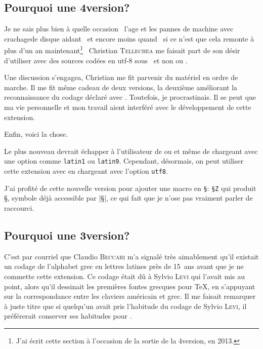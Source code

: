 \documentclass[full, french]{l3doc}
\newcommand*\PS{\texttt{\S}\xspace}
\newcommand*\PSVerb[1]{\texttt{\S #1}}
\newcommand{\TO}{\textemdash\ \ignorespaces}
\newcommand{\TF}{\unskip\ \textemdash\xspace}
\begin{document}
\subsection{Pourquoi une 4\ieme version?}

Je ne sais plus bien à quelle occasion \TO l'age et les pannes de machine
avec \og crachage\fg de disque aidant\TF et encore moins quand \TO si ce
n'est que cela remonte à plus d'un an maintenant\footnote{J'ai écrit cette
  section à l'occasion de la sortie de la 4\ieme version, en 2013.}\TF
Christian \textsc{Tellechea} me faisait part de son désir d'utiliser
 avec des sources codées en utf-8 sous  \TO et
non  ou .

Une discussion s'engagea, Christian me fit parvenir du matériel en
ordre de marche. Il me fit même cadeau de deux versions, la deuxième
améliorant la reconnaissance du codage déclaré avec
. Toutefois, je procrastinais. Il se peut que ma vie
personnelle et mon travail aient interféré avec le développement de
cette extension.

Enfin, voici la chose.

Le plus nouveau devrait échapper à l'utilisateur de 
ou  et même de  chargeant 
avec une option comme \texttt{latin1} ou \texttt{latin9}. Cependant,
désormais, on peut utiliser cette extension avec  en
chargeant  avec l'option \texttt{utf8}.

J'ai profité de cette nouvelle version pour ajouter une macro en \PS:
\PSVerb{Z} qui produit \S, symbole déjà accessible par |\S|, ce qui
fait que je n'ose pas vraiment parler de \og raccourci\fg.

\subsection{Pourquoi une 3\ieme version?}

C'est par courriel que Claudio \textsc{Beccari} m'a signalé très
aimablement qu'il existait un codage de l'alphabet grec en lettres
latines près de 15~ans avant que je ne commette cette extension. Ce
codage était dû à Sylvio \textsc{Levi} qui l'avait mis au point, alors
qu'il dessinait les premières fontes grecques pour \TeX, en s'appuyant
sur la correspondance entre les claviers américain et grec.  Il me
faisait remarquer à juste titre que si quelqu'un avait pris l'habitude
du codage de Sylvio \textsc{Levi}, il préférerait conserver ses
habitudes pour .
\end{document}
